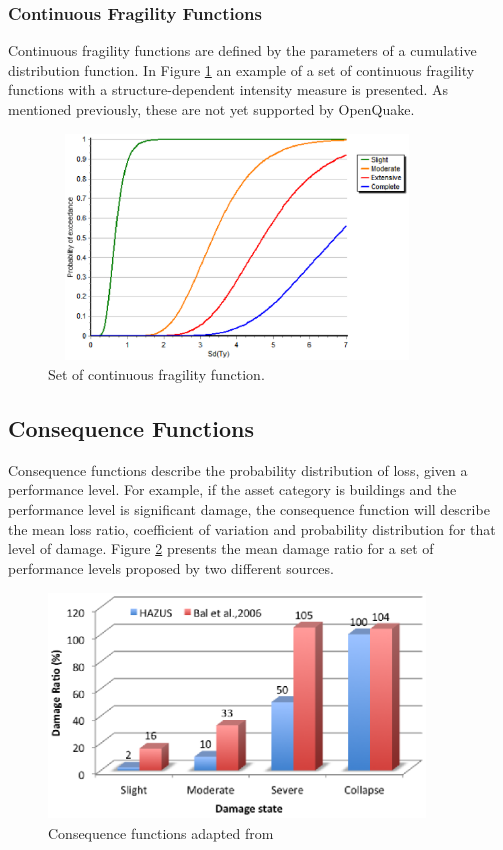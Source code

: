 \subsubsection{Continuous Fragility Functions}
Continuous fragility functions are defined by the parameters of a cumulative distribution function. In Figure \ref{fig:FFcontinuous} an example of a set of continuous fragility functions with a structure-dependent intensity measure is presented. As mentioned previously, these are not yet supported by OpenQuake.

\begin{figure}[ht]
\centering
\includegraphics[width=10cm,height=6cm]{./Figures/Part_Risk/FFContinuous.eps}
\caption{Set of continuous fragility function.}
\label{fig:FFcontinuous}
\end{figure}

\subsection{Consequence Functions}
Consequence functions describe the probability distribution of loss, given a performance level. For example, if the asset category is buildings and the performance level is significant damage, the consequence function will describe the mean loss ratio, coefficient of variation and probability distribution for that level of damage. Figure \ref{fig:ConsequenceFunctions} presents the mean damage ratio for a set of performance levels proposed by two different sources. 

\begin{figure}[ht]
\centering
\includegraphics[width=10cm,height=6cm]{./Figures/Part_Risk/ConsequenceFunction.eps}
\caption{Consequence functions adapted from  \citet{Baletal2010}}
\label{fig:ConsequenceFunctions}
\end{figure}

